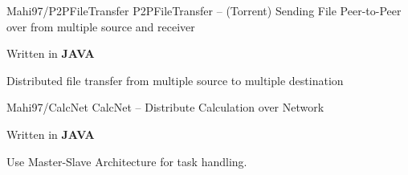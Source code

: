 \begin{cventries}

    \cventry
    {Mahi97/P2PFileTransfer} %
    {P2PFileTransfer -- (Torrent) Sending File Peer-to-Peer over from multiple source and receiver} %
    {} %
    {} %
    {
      \begin{cvitems} %
        \item {Written in \textbf{JAVA}}
        \item {Distributed file transfer from multiple source to multiple destination}
      \end{cvitems}
    }

    
    \cventry
    {Mahi97/CalcNet} %
    {CalcNet -- Distribute Calculation over Network} %
    {} %
    {} %
    {
      \begin{cvitems} %
        \item {Written in \textbf{JAVA}}
        \item {Use Master-Slave Architecture for task handling.}
      \end{cvitems}
    }






\end{cventries}
